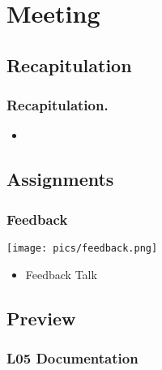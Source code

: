\section{Meeting}

\subsection{Recapitulation}

\begin{frame}
	\frametitle{Recapitulation.}
	\begin{itemize}
		\item 
	\end{itemize}
\end{frame}

\subsection{Assignments}

\begin{frame}
	\frametitle{Feedback}

	\hfill \texttt{[image: pics/feedback.png]}
	\vspace{-1cm}
	\begin{itemize}
		\item Feedback Talk
	\end{itemize}
\end{frame}

\subsection{Preview}

\begin{frame}
	\frametitle{L05 Documentation}
\end{frame}



